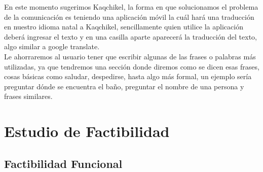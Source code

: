 \documentclass[a4paper,openright,11pt]{article}
\begin{document}
En este momento sugerimos Kaqchikel, la forma en que solucionamos el problema de la comunicación es teniendo una aplicación m\'ovil la cu\'al hará una traducción en nuestro idioma natal a Kaqchikel, sencillamente quien utilice la aplicación deberá ingresar el texto y en una casilla aparte aparecer\'a la traducci\'on del texto, algo similar a google translate.\\

Le ahorraremos al usuario tener que escribir algunas de las frases o palabras m\'as utilizadas, ya que tendremos una secci\'on donde diremos como se dicen esas frases, cosas b\'asicas como saludar, despedirse, hasta algo m\'as formal, un ejemplo ser\'ia preguntar d\'onde se encuentra el baño, preguntar el nombre de una persona y frases similares.\\
\newpage

\section{Estudio de Factibilidad}
\subsection{Factibilidad Funcional}
\end{document}
